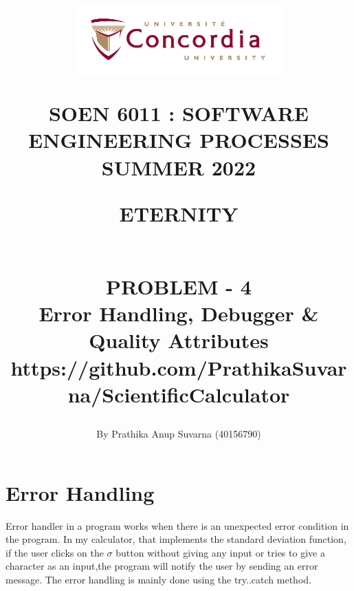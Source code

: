 \documentclass[12pt,letterpaper]{report}
\begin{document}
\title{\begin{figure}[htb]
\begin{center}
\includegraphics[width=8cm]{univ_logo}
\end{center}
\end{figure}SOEN 6011 : SOFTWARE ENGINEERING PROCESSES\\[.5em]
SUMMER 2022\\\vspace*{0.9in}
\begin{Large}
\textbf{ETERNITY} 
\end{Large}
\vspace*{0.9in}
\begin{Large}
\textbf{\\PROBLEM - 4} 
\\Error Handling, Debugger  \& Quality Attributes\\ 
\small{https://github.com/PrathikaSuvarna/ScientificCalculator}
\end{Large}}
\author{By Prathika Anup Suvarna (40156790)}
\maketitle 
{}
\setcounter{page}{0}

\tableofcontents

\chapter{Error Handling}
Error handler in a program works when there is an unexpected error condition in the program.
In my calculator, that implements the standard deviation function, if the user clicks on the $\sigma$ button without giving any input or tries to give a character as an input,the program
will notify the user by sending an error message.
The error handling is mainly done using the try..catch method.
\end{document}
